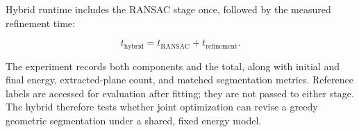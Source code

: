 Hybrid runtime includes the RANSAC stage once, followed by the measured refinement time:

\begin{equation}
t_{\mathrm{hybrid}}=t_{\mathrm{RANSAC}}+t_{\mathrm{refinement}}.
\label{eq:56}
\end{equation}

The experiment records both components and the total, along with initial and final energy, extracted-plane count, and matched segmentation metrics. Reference labels are accessed for evaluation after fitting; they are not passed to either stage. The hybrid therefore tests whether joint optimization can revise a greedy geometric segmentation under a shared, fixed energy model.
